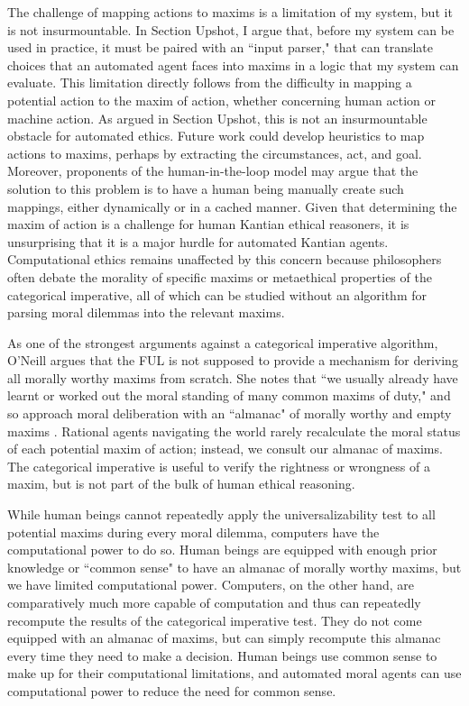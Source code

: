 \begin{isabellebody}
\begin{isamarkuptext}
The challenge of mapping actions to maxims is a limitation of my system, but it is not insurmountable. In Section Upshot,
I argue that, before my system can be used in practice, it must be paired with an ``input parser," that can
translate choices that an automated agent faces into maxims in a logic that my system can
evaluate. This limitation directly follows from the difficulty in mapping a potential action
to the maxim of action, whether concerning human action or machine action. As argued in Section Upshot,  
this is not an insurmountable obstacle for automated ethics. Future work could develop heuristics to 
map actions to maxims, perhaps by extracting the circumstances, act, and goal. Moreover, proponents of the 
human-in-the-loop model may argue that the solution to this problem is to have a human being manually create
such mappings, either dynamically or in a cached manner. Given that determining the maxim of action is a challenge
for human Kantian ethical reasoners, it is unsurprising that it is a major hurdle for automated Kantian agents. 
Computational ethics remains unaffected by this concern because philosophers often debate 
the morality of specific maxims or metaethical properties of the categorical imperative, all of which can
be studied without an algorithm for parsing moral dilemmas into the relevant maxims.

As one of the strongest arguments against a categorical imperative algorithm, O'Neill argues that 
the FUL is not supposed to provide a mechanism for deriving all morally worthy maxims from scratch. She notes
that ``we usually already have learnt or worked out the moral standing of many common maxims of duty," 
and so approach moral deliberation with an ``almanac" of morally worthy and empty maxims \citep[394]{oneilluniversallaws}. Rational agents
navigating the world rarely recalculate the moral status of each potential maxim of action; instead, we consult our
almanac of maxims. The categorical imperative is useful to verify the rightness or 
wrongness of a maxim, but is not part of the bulk of human ethical reasoning.

While human beings cannot repeatedly apply the universalizability test to all potential maxims during 
every moral dilemma, computers have the computational power to do so. Human beings are 
equipped with enough prior knowledge or ``common sense" to have an almanac of morally worthy maxims,
but we have limited computational power. Computers, on the other hand, are comparatively
much more capable of computation and thus can repeatedly recompute the results of the categorical
imperative test. They do not come equipped with an almanac of maxims, but can simply recompute this
almanac every time they need to make a decision. Human beings use common sense to make up for their computational
limitations, and automated moral agents can use computational power to reduce the need for common sense.


\end{isamarkuptext}
\end{isabellebody}
